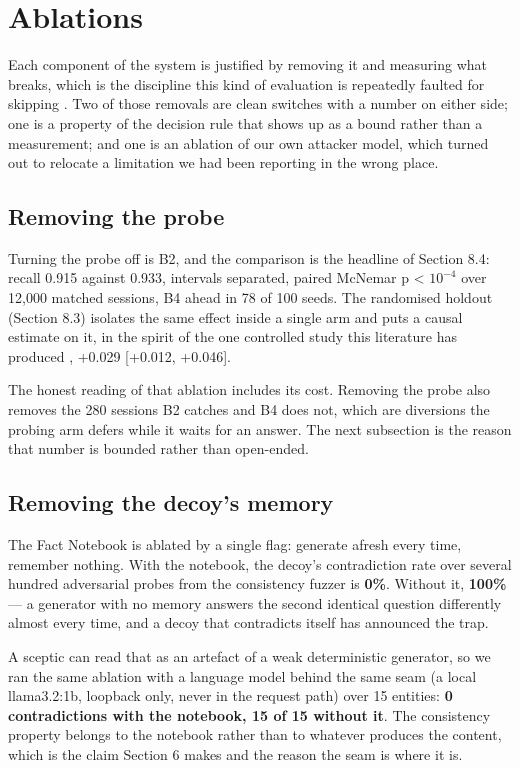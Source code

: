 
\section{Ablations}

Each component of the system is justified by removing it and measuring what breaks,
which is the discipline this kind of evaluation is repeatedly faulted for skipping
\cite{arp2022dos,sommer2010outside}.
Two of those removals are clean switches with a number on either side; one is a
property of the decision rule that shows up as a bound rather than a measurement;
and one is an ablation of our own attacker model, which turned out to relocate a
limitation we had been reporting in the wrong place.


\subsection{Removing the probe}

Turning the probe off is B2, and the comparison is the headline of Section 8.4:
recall 0.915 against 0.933, intervals separated, paired McNemar p < $10^{-4}$ over
12,000 matched sessions, B4 ahead in 78 of 100 seeds. The randomised holdout
(Section 8.3) isolates the same effect inside a single arm and puts a causal
estimate on it, in the spirit of the one controlled study this literature has
produced \cite{fergusonwalter2021examining}, +0.029 [+0.012, +0.046].

The honest reading of that ablation includes its cost. Removing the probe also
removes the 280 sessions B2 catches and B4 does not, which are diversions the
probing arm defers while it waits for an answer. The next subsection is the reason
that number is bounded rather than open-ended.


\subsection{Removing the decoy's memory}

The Fact Notebook is ablated by a single flag: generate afresh every time, remember
nothing. With the notebook, the decoy's contradiction rate over several hundred
adversarial probes from the consistency fuzzer is \textbf{0\%}. Without it, \textbf{100\%} --- a
generator with no memory answers the second identical question differently almost
every time, and a decoy that contradicts itself has announced the trap.

A sceptic can read that as an artefact of a weak deterministic generator, so we ran
the same ablation with a language model behind the same seam (a local
llama3.2:1b, loopback only, never in the request path) over 15 entities:
\textbf{0 contradictions with the notebook, 15 of 15 without it}. The consistency
property belongs to the notebook rather than to whatever produces the content,
which is the claim Section 6 makes and the reason the seam is where it is.

